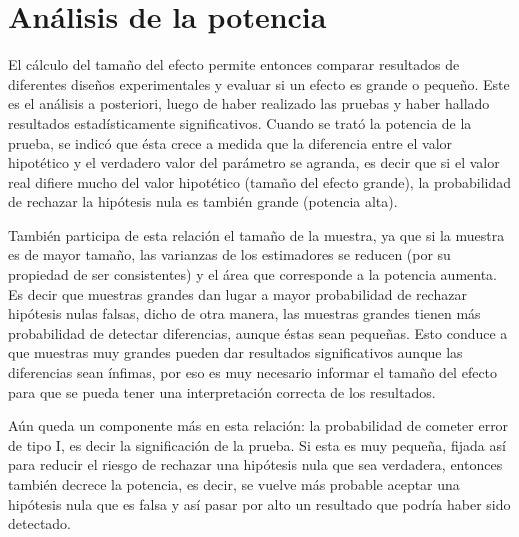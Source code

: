 \documentclass[]{book}
\begin{document}
\hypertarget{anuxe1lisis-de-la-potencia}{%
\section{Análisis de la potencia}\label{anuxe1lisis-de-la-potencia}}

El cálculo del tamaño del efecto permite entonces comparar resultados de
diferentes diseños experimentales y evaluar si un efecto es grande o
pequeño. Este es el análisis a posteriori, luego de haber realizado las
pruebas y haber hallado resultados estadísticamente significativos.
Cuando se trató la potencia de la prueba, se indicó que ésta crece a
medida que la diferencia entre el valor hipotético y el verdadero valor
del parámetro se agranda, es decir que si el valor real difiere mucho
del valor hipotético (tamaño del efecto grande), la probabilidad de
rechazar la hipótesis nula es también grande (potencia alta).

También participa de esta relación el tamaño de la muestra, ya que si la
muestra es de mayor tamaño, las varianzas de los estimadores se reducen
(por su propiedad de ser consistentes) y el área que corresponde a la potencia aumenta. Es decir
que muestras grandes dan lugar a mayor probabilidad de rechazar
hipótesis nulas falsas, dicho de otra manera, las muestras grandes
tienen más probabilidad de detectar diferencias, aunque éstas sean
pequeñas. Esto conduce a que muestras muy grandes pueden dar resultados
significativos aunque las diferencias sean ínfimas, por eso es muy
necesario informar el tamaño del efecto para que se pueda tener una
interpretación correcta de los resultados.

Aún queda un componente más en esta relación: la probabilidad de cometer
error de tipo I, es decir la significación de la prueba. Si esta es muy
pequeña, fijada así para reducir el riesgo de rechazar una hipótesis
nula que sea verdadera, entonces también decrece la potencia, es decir,
se vuelve más probable aceptar una hipótesis nula que es falsa y así
pasar por alto un resultado que podría haber sido detectado.
\end{document}
